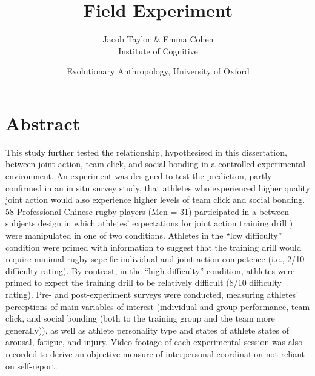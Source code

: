 \documentclass[english]{article}\usepackage[]{graphicx}\usepackage[]{color}
\makeatletter
\newenvironment{kframe}{%
 \def\at@end@of@kframe{}%
 \ifinner\ifhmode%
  \def\at@end@of@kframe{\end{minipage}}%
  \begin{minipage}{\columnwidth}%
 \fi\fi%
 \def\FrameCommand##1{\hskip\@totalleftmargin \hskip-\fboxsep
 \colorbox{shadecolor}{##1}\hskip-\fboxsep
     \hskip-\linewidth \hskip-\@totalleftmargin \hskip\columnwidth}%
 \MakeFramed {\advance\hsize-\width
   \@totalleftmargin\z@ \linewidth\hsize
   \@setminipage}}%
 {\par\unskip\endMakeFramed%
 \at@end@of@kframe}
\newenvironment{knitrout}{}{} %
\makeatother
\begin{document}
\begin{knitrout}
\color{fgcolor}\begin{kframe}


{\ttfamily\noindent\color{warningcolor}{\#\# Warning: package 'tableone' was built under R version 3.3.2}}

{\ttfamily\noindent\color{warningcolor}{\#\# Warning: package 'apa' was built under R version 3.3.2}}

{\ttfamily\noindent\color{warningcolor}{\#\# Warning: package 'ggplot2' was built under R version 3.3.2}}\end{kframe}
\end{knitrout}




\title{Field Experiment}
\date{}
\author{Jacob Taylor & Emma Cohen \\ Institute of Cognitive \and Evolutionary Anthropology, University of Oxford}



\section{Abstract}
This study further tested the relationship, hypothesised in this dissertation, between joint action, team click, and social bonding in a controlled experimental environment.  An experiment was designed to test the prediction, partly confirmed in an in situ survey study, that athletes who experienced higher quality joint action would also experience higher levels of team click and social bonding.  58 Professional Chinese rugby players (Men = 31) participated in a between-subjects design in which athletes' expectations for joint action training drill \citep[``Invasion drill''][]{Passos2011}) were manipulated in one of two conditions.  Athletes in the ``low difficulty'' condition were primed with information to suggest that the training drill would require minimal rugby-sepcific individual and joint-action competence (i.e., 2/10 difficulty rating).  By contrast, in the ``high difficulty'' condition, athletes were primed to expect the training drill to be relatively difficult (8/10 difficulty rating). Pre- and post-experiment surveys were conducted, measuring athletes' perceptions of main variables of interest (individual and group performance, team click, and social bonding (both to the training group and the team more generally)), as well as athlete personality type and states of athlete states of arousal, fatigue, and injury.  Video footage of each experimental session was also recorded to derive an objective measure of interpersonal coordination not reliant on self-report.
\end{document}
